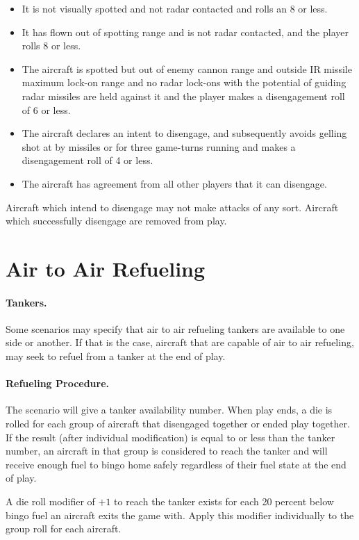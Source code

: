 \begin{itemize}

    \item It is not visually spotted and not radar contacted and rolls an 8 or less.

    \item It has flown out of spotting range and is not radar contacted, and the player rolls 8 or less.

    \item The aircraft is spotted but out of enemy cannon range and outside IR missile maximum lock-on range and no radar lock-ons with the potential of guiding radar missiles are held against it and the player makes a disengagement roll of 6 or less.

    \item The aircraft declares an intent to disengage, and subsequently avoids gelling shot at by missiles or for three game-turns running and makes a disengagement roll of 4 or less.

    \item The aircraft has agreement from all other players that it can disengage.

\end{itemize}

Aircraft which intend to disengage may not make attacks of any sort. Aircraft which successfully disengage are removed from play.

\section{Air to Air Refueling}

\paragraph{Tankers.} Some scenarios may specify that air to air refueling tankers are available to one side or another. If that is the case, aircraft that are capable of air to air refueling, may seek to refuel from a tanker at the end of play.

\paragraph{Refueling Procedure.} The scenario will give a tanker availability number. When play ends, a die is rolled for each group of aircraft that disengaged together or ended play together. If the result (after individual modification) is equal to or less than the tanker number, an aircraft in that group is considered to reach the tanker and will receive enough fuel to bingo home safely regardless of their fuel state at the end of play.

A die roll modifier of $+1$ to reach the tanker exists for each 20 percent below bingo fuel an aircraft exits the game with. Apply this modifier individually to the group roll for each aircraft.
